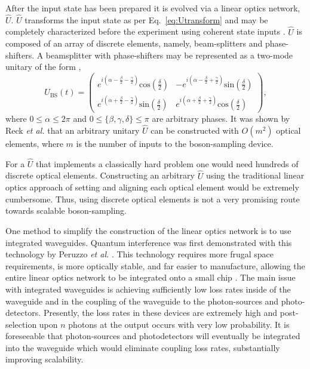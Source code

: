 \documentclass[aps,pra,twocolumn,amsmath,amssymb,nofootinbib,superscriptaddress]{revtex4}
\begin{document}
After the input state has been prepared it is evolved via a linear optics network, $\hat{U}$. $\hat{U}$ transforms the input state as per Eq.~\ref{eq:Utransform} and may be completely characterized before the experiment using coherent state inputs \cite{bib:PhysRevLett.73.58}. $\hat{U}$ is composed of an array of discrete elements, namely, beam-splitters and phase-shifters. A beamsplitter with phase-shifters may be represented as a two-mode unitary of the form \cite{bib:GerryKnight05},
\begin{equation} \label{eq:BS}
U_{\mathrm{BS}}(t) = \left( \begin{array}{cc}
e^{i(\alpha-\frac{\beta}{2}-\frac{\gamma}{2})}\mathrm{cos}\left(\frac{\delta}{2}\right) & -e^{i(\alpha-\frac{\beta}{2}+\frac{\gamma}{2})}\mathrm{sin}\left(\frac{\delta}{2}\right)  \\
e^{i(\alpha+\frac{\beta}{2}-\frac{\gamma}{2})}\mathrm{sin}\left(\frac{\delta}{2}\right) & e^{i(\alpha+\frac{\beta}{2}+\frac{\gamma}{2})}\mathrm{cos}\left(\frac{\delta}{2}\right)
\end{array} \right), 
\end{equation}
where \mbox{$0\leq\alpha\leq2\pi$} and \mbox{$0\leq\{\beta,\gamma,\delta\}\leq\pi$} are arbitrary phases. It was shown by Reck \emph{et al.} \cite{bib:Reck94} that an arbitrary unitary $\hat{U}$ can be constructed with $O(m^2)$ optical elements, where $m$ is the number of inputs to the boson-sampling device.

For a $\hat{U}$ that implements a classically hard problem one would need hundreds of discrete optical elements. Constructing an arbitrary $\hat{U}$ using the traditional linear optics approach of setting and aligning each optical element would be extremely cumbersome. Thus, using discrete optical elements is not a very promising route towards scalable boson-sampling.

One method to simplify the construction of the linear optics network is to use integrated waveguides. Quantum interference was first demonstrated with this technology by Peruzzo \emph{et al.} \cite{bib:peruzzo2011multimode}. This technology requires more frugal space requirements, is more optically stable, and far easier to manufacture, allowing the entire linear optics network to be integrated onto a small chip \cite{bib:Politi02052008, bib:matthews2009, bib:Politi04092009}. The main issue with integrated waveguides is achieving sufficiently low loss rates inside of the waveguide and in the coupling of the waveguide to the photon-sources and photo-detectors. Presently, the loss rates in these devices are extremely high and post-selection upon $n$ photons at the output occurs with very low probability. It is foreseeable that photon-sources and photodetectors will eventually be integrated into the waveguide which would eliminate coupling loss rates, substantially improving scalability.   
\end{document}
